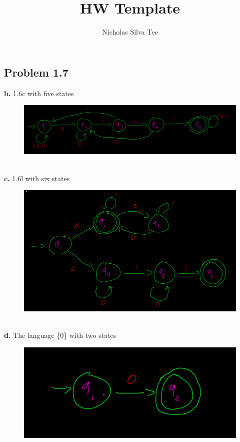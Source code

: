 \documentclass[letter]{article}
\title{HW Template}
\author{Nicholas Silva Tee}
\theoremstyle{case}
\begin{document}
\subsection*{Problem 1.7}
\textbf{b. } 1.6c with five states\\
\begin{figure}[h!]
	\includegraphics[scale=0.4]{7b.png}
\end{figure} \\
\textbf{c. } 1.6l with six states\\
\begin{figure}[h!]
	\includegraphics[scale=0.4]{7c.png}
\end{figure} \\
\textbf{d. } The language \{0\} with two states \\
\begin{figure}[h!]
	\includegraphics[scale=0.4]{7d.png}
\end{figure} 
\newpage
\end{document}
